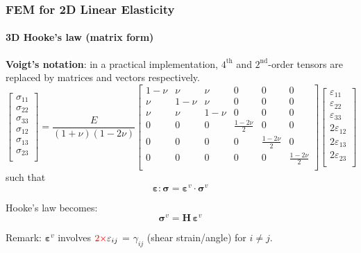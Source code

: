 \documentclass[10pt,xcolor=pdftex,dvipsnames,table]{beamer}
\begin{document}
\begin{frame}
	\frametitle{ FEM for 2D Linear Elasticity }
	\framesubtitle{ 3D Hooke's law (matrix form) }
	
	\textbf{Voigt's notation}: in a practical implementation, $4^{\text{th}}$ and $2^{\text{nd}}$-order tensors are replaced by matrices and vectors respectively.
	\begin{equation*}
		\begin{bmatrix}
			\sigma_{11} \\
			\sigma_{22} \\
			\sigma_{33} \\
			\sigma_{12} \\
			\sigma_{13} \\
			\sigma_{23} \\	
		\end{bmatrix}
		= \frac{E}{(1+\nu)(1-2\nu)}
		\begin{bmatrix}
			1-\nu & \nu & \nu & 0 & 0 & 0 \\
			\nu & 1-\nu &  \nu & 0 & 0 & 0 \\
			\nu & \nu & 1-\nu &  0 & 0 & 0 \\
			0 &0 & 0 & \frac{1-2\nu}{2} & 0 & 0 \\
			0 &0 & 0 & 0 &\frac{1-2\nu}{2}  & 0 \\
			0 &0 & 0  & 0 & 0 & \frac{1-2\nu}{2} \\
		\end{bmatrix}
		\begin{bmatrix}
			\varepsilon_{11} \\
			\varepsilon_{22} \\
			\varepsilon_{33} \\
			2\varepsilon_{12} \\
			2\varepsilon_{13} \\
			2\varepsilon_{23} \\	
		\end{bmatrix}			
	\end{equation*}	
	such that
	\begin{equation*}
		\boldsymbol{\varepsilon}:\boldsymbol{\sigma} = \boldsymbol{\varepsilon}^v\cdot \boldsymbol{\sigma}^v
	\end{equation*}	
	
	Hooke's law becomes:
	\begin{equation*}
		\boldsymbol{\sigma}^v = \mathbf{H}\,\boldsymbol{\varepsilon}^v
	\end{equation*}		

		
	Remark: $\boldsymbol{\varepsilon}^v$ involves ${\color{red}2\times}\varepsilon_{ij}$ = $\gamma_{ij}$ (shear strain/angle) for $i\neq j$.

\end{frame}
\end{document}
